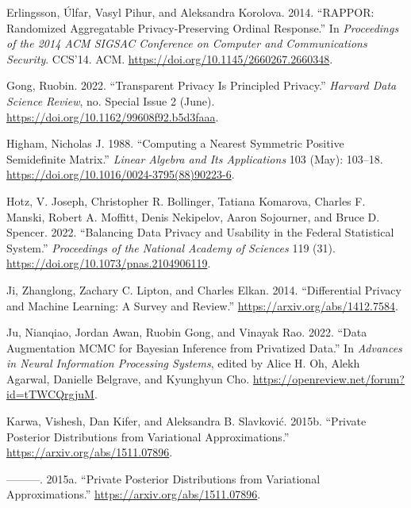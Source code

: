 \begin{CSLReferences}{1}{0}
\leavevmode{}%
Erlingsson, Úlfar, Vasyl Pihur, and Aleksandra Korolova. 2014. {``RAPPOR: Randomized Aggregatable Privacy-Preserving Ordinal Response.''} In \emph{Proceedings of the 2014 ACM SIGSAC Conference on Computer and Communications Security}. CCS'14. ACM. \url{https://doi.org/10.1145/2660267.2660348}.

\leavevmode{}%
Gong, Ruobin. 2022. {``Transparent Privacy Is Principled Privacy.''} \emph{Harvard Data Science Review}, no. Special Issue 2 (June). \url{https://doi.org/10.1162/99608f92.b5d3faaa}.

\leavevmode{}%
Higham, Nicholas J. 1988. {``Computing a Nearest Symmetric Positive Semidefinite Matrix.''} \emph{Linear Algebra and Its Applications} 103 (May): 103--18. \url{https://doi.org/10.1016/0024-3795(88)90223-6}.

\leavevmode{}%
Hotz, V. Joseph, Christopher R. Bollinger, Tatiana Komarova, Charles F. Manski, Robert A. Moffitt, Denis Nekipelov, Aaron Sojourner, and Bruce D. Spencer. 2022. {``Balancing Data Privacy and Usability in the Federal Statistical System.''} \emph{Proceedings of the National Academy of Sciences} 119 (31). \url{https://doi.org/10.1073/pnas.2104906119}.

\leavevmode{}%
Ji, Zhanglong, Zachary C. Lipton, and Charles Elkan. 2014. {``Differential Privacy and Machine Learning: A Survey and Review.''} \url{https://arxiv.org/abs/1412.7584}.

\leavevmode{}%
Ju, Nianqiao, Jordan Awan, Ruobin Gong, and Vinayak Rao. 2022. {``Data Augmentation {MCMC} for Bayesian Inference from Privatized Data.''} In \emph{Advances in Neural Information Processing Systems}, edited by Alice H. Oh, Alekh Agarwal, Danielle Belgrave, and Kyunghyun Cho. \url{https://openreview.net/forum?id=tTWCQrgjuM}.

\leavevmode{}%
Karwa, Vishesh, Dan Kifer, and Aleksandra B. Slavković. 2015b. {``Private Posterior Distributions from Variational Approximations.''} \url{https://arxiv.org/abs/1511.07896}.

\leavevmode{}%
---------. 2015a. {``Private Posterior Distributions from Variational Approximations.''} \url{https://arxiv.org/abs/1511.07896}.


\end{CSLReferences}
